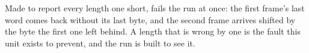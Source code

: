 Made to report every length one short,  fails the run at
once: the first frame's last word comes back without its last byte, and
the second frame arrives shifted by the byte the first one left behind.
A length that is wrong by one is the fault this unit exists to prevent,
and the run is built to see it.




